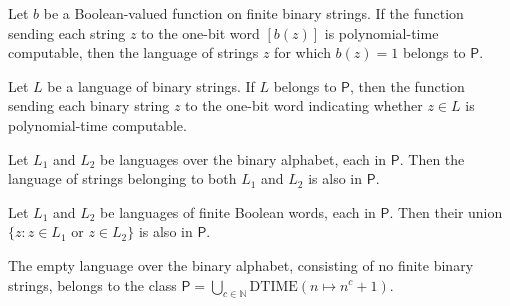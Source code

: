 \begin{theorem}
\label{Complexity.mem_P_of_test}
\leanok
{}
Let $b$ be a Boolean-valued function on finite binary strings. If the function sending
each string $z$ to the one-bit word $[b(z)]$ is polynomial-time computable, then the
language of strings $z$ for which $b(z)=1$ belongs to $\mathsf{P}$.
\end{theorem}

\begin{theorem}
\label{Complexity.test_of_mem_P}
\leanok
{}
Let $L$ be a language of binary strings. If $L$ belongs to $\mathsf{P}$, then the
function sending each binary string $z$ to the one-bit word indicating whether $z\in L$
is polynomial-time computable.
\end{theorem}

\begin{theorem}
\label{Complexity.inter_mem_P}
\leanok
{}
Let $L_1$ and $L_2$ be languages over the binary alphabet, each in $\mathsf{P}$.
Then the language of strings belonging to both $L_1$ and $L_2$ is also in
$\mathsf{P}$.
\end{theorem}

\begin{theorem}
\label{Complexity.union_mem_P}
\leanok
{}
Let $L_1$ and $L_2$ be languages of finite Boolean words, each in $\mathsf{P}$. Then
their union $\{z : z\in L_1\text{ or }z\in L_2\}$ is also in $\mathsf{P}$.
\end{theorem}

\begin{theorem}
\label{Complexity.empty_mem_P}
\leanok
{}
The empty language over the binary alphabet, consisting of no finite binary strings,
belongs to the class $\mathsf{P}=\bigcup_{c\in\mathbb{N}}\mathrm{DTIME}(n\mapsto
n^c+1)$.
\end{theorem}

